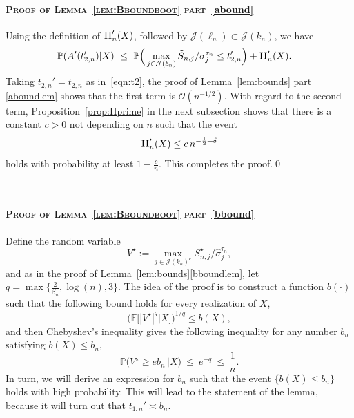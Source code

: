 \documentclass[aos,preprint]{imsart}
\numberwithin{equation}{section}
\theoremstyle{plain}
\renewcommand{\hat}[1]{\widehat{#1}}
\newcommand{\II}{\textsc{II}}
\newcommand{\J}{\mathcal{J}}
\renewcommand{\P}{\mathbb{P}}
\newcommand{\E}{\mathbb{E}}
\newcommand{\ts}{\textstyle}
\newcommand{\1}{{\bf{1}}}
\newcommand{\0}{\mathbf{0}}
\begin{document}
\paragraph{\textsc{Proof of Lemma~\ref{lem:Bboundboot} part}~\eqref{abound}}Using the definition of $\II_n'(X)$, followed by  $\J(\ell_n)\subset \J(k_n)$, we have
\begin{equation}
\begin{split}
\P(A'(t'_{2,n})|X) 
%
& \ \leq \ \P\Big(\max_{j\in \J(\ell_n)} \tilde S_{n,j}/\sigma_j^{\tau_n}\leq t'_{2,n}\Big) +\II_n'(X).
\end{split}
\end{equation}
Taking $t_{2,n}'=t_{2,n}$ as in~\eqref{eqn:t2}, the proof of Lemma~\ref{lem:bounds} part \eqref{aboundlem} shows that the first term is $\mathcal{O}(n^{-1/2})$. With regard to the second term, Proposition~\ref{prop:IIprime} in the next subsection shows that  there is a constant $c>0$ not depending on $n$ such that the event
\begin{equation}
\II_n'(X) \leq c\, n^{-\frac 12+\delta}
\end{equation}
holds with probability at least $1-\frac cn$. This completes the proof.\qed












~\\


\paragraph{\textsc{Proof of Lemma~\ref{lem:Bboundboot} part}~\eqref{bbound}} Define the random variable
\begin{equation}\label{eqn:Vstar}
V^{\star}:=\max_{j\in\J(k_n)^c} S_{n,j}^{\star}/\hat\sigma_j^{\tau_n},
\end{equation}
and as in the proof of Lemma~\ref{lem:bounds}\eqref{bboundlem}, let 
$q =\max\big\{\ts\frac{2}{\beta_n},\log(n),3\big\}.$
The idea of the proof is to construct a function $b(\cdot)$ such that the following bound holds for every realization of $X$,
$$\Big( \E\big[|V^{\star}|^q\big | X\big]\Big)^{1/q} \leq  b(X),$$
and then Chebyshev's inequality gives the following inequality for any number $b_n$ satisfying $b(X)\leq b_n$,
$$\P\Big(V^{\star} \geq e b_n\, \Big | X\Big)  \ \leq \ e^{-q} \ \leq \ \ts\frac 1n.$$
%
In turn, we will derive an expression for $b_n$ such that the event $\{b(X)\leq b_n\}$ holds with high probability.
This will lead to the statement of the lemma, because it will turn out that $t_{1,n}'\asymp b_n$.\\
\end{document}
